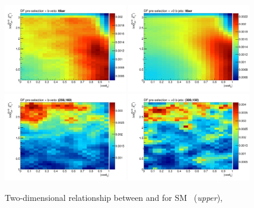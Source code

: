 \begin{figure}[!htb]
    \begin{center}
        \includegraphics[width=0.48\textwidth]{figures/search_stop2l/strategy/corr2d/wwbveto_cosThetaB_DPB_vSS_ttbar_2d}
        \includegraphics[width=0.48\textwidth]{figures/search_stop2l/strategy/corr2d/wwb_cosThetaB_DPB_vSS_ttbar_2d}
        \includegraphics[width=0.48\textwidth]{figures/search_stop2l/strategy/corr2d/wwbveto_cosThetaB_DPB_vSS_bwn250_160_2d}
        \includegraphics[width=0.48\textwidth]{figures/search_stop2l/strategy/corr2d/wwb_cosThetaB_DPB_vSS_bwn300_150_2d}
        \caption{
            Two-dimensional relationship between \dpb and \cosb for SM \ttbar~(\textit{upper}),
}
\end{center}
\end{figure}
